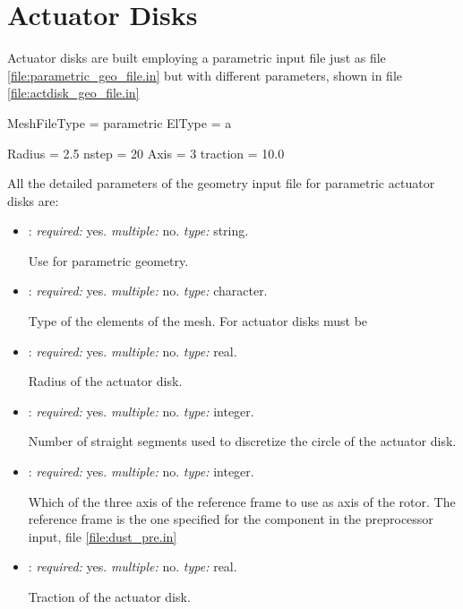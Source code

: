 \section{Actuator Disks}
\label{sec:ActuatorDisks}
Actuator disks are built employing a parametric input file just as file \ref{file:parametric_geo_file.in} but with different parameters, shown in file \ref{file:actdisk_geo_file.in} 

\begin{inputfile}[frame=single, caption={actdisk\_geo\_file.in}, label={file:actdisk_geo_file.in}]
MeshFileType = parametric
ElType = a

Radius = 2.5
nstep = 20
Axis = 3
traction = 10.0
\end{inputfile}


All the detailed parameters of the geometry input file for parametric actuator disks are:
\begin{itemize}
\item {}: \textit{required:} yes. \textit{multiple:} no. \textit{type:} string. 

Use  for parametric geometry.

\item {}: \textit{required:} yes. \textit{multiple:} no. \textit{type:} character.

Type of the elements of the mesh. For actuator disks must be 

\item {}: \textit{required:} yes. \textit{multiple:} no. \textit{type:} real.

Radius of the actuator disk.

\item {}: \textit{required:} yes. \textit{multiple:} no. \textit{type:} integer.

Number of straight segments used to discretize the circle of the actuator disk.

\item {}: \textit{required:} yes. \textit{multiple:} no. \textit{type:} integer.

Which of the three axis of the reference frame to use as axis of the rotor. The reference frame is the one specified for the component in the preprocessor input, file \ref{file:dust_pre.in}

\item {}: \textit{required:} yes. \textit{multiple:} no. \textit{type:} real.

Traction of the actuator disk.
\end{itemize}



